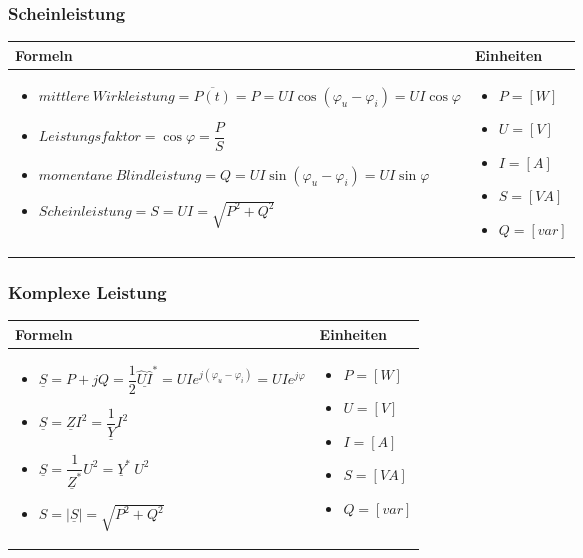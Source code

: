 \subsubsection{Scheinleistung}
\begin{tabular}{ | m{15cm} | m{3cm}  | }
	\hline
	Formeln & Einheiten \\ \hline
	\hline
	\begin{itemize}
		\item[] $mittlere\ Wirkleistung=\overline{P(t)}=P=UI\cos(\varphi_u-\varphi_i)=UI\cos\varphi$
		\item[] $Leistungsfaktor=\cos\varphi=\dfrac{P}{S}$
		\item[] $momentane\ Blindleistung=Q=UI\sin(\varphi_u-\varphi_i)=UI\sin\varphi$
		\item[] $Scheinleistung=S=UI=\sqrt{P^2+Q^2}$
	\end{itemize}
	&
	\begin{itemize}
		\item[] $P=[W]$
		\item[] $U=[V]$
		\item[] $I=[A]$
		\item[] $S=[VA]$
		\item[] $Q=[var]$
	\end{itemize}   	
	\\ \hline
\end{tabular}

\newpage
\subsubsection{Komplexe Leistung}
\begin{tabular}{ | m{15cm} | m{3cm}  | }
	\hline
	Formeln & Einheiten \\ \hline
	\hline
	\begin{itemize}
		\item[] $\underline{S}=P+jQ=\dfrac{1}{2}\underline{\hat{U}\hat{I}}^*=UIe^{j(\varphi_u-\varphi_i)}=UIe^{j\varphi}$
		\item[] $\underline{S}=\underline{Z}I^2=\dfrac{1}{\underline{Y}}I^2$
		\item[] $\underline{S}=\dfrac{1}{\underline{Z}^*}U^2=\underline{Y}^*\ U^2$
		\item[] $S=|\underline{S}|=\sqrt{P^2+Q^2}$
	\end{itemize}
	&
	\begin{itemize}
		\item[] $P=[W]$
		\item[] $U=[V]$
		\item[] $I=[A]$
		\item[] $S=[VA]$
		\item[] $Q=[var]$
	\end{itemize}   	
	\\ \hline
\end{tabular}

